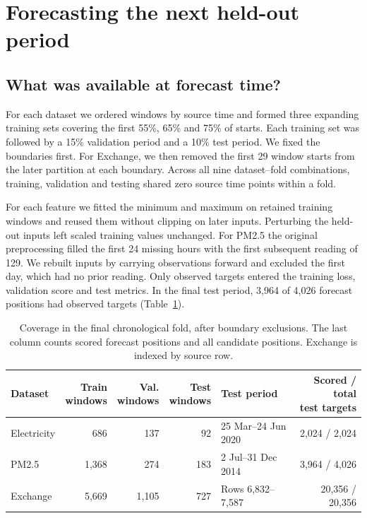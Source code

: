 \documentclass[10pt,a4paper]{article}
\begin{document}
\section{Forecasting the next held-out period}\label{sec:chronology}
\subsection{What was available at forecast time?}
For each dataset we ordered windows by source time and formed three expanding training sets covering the first 55\%, 65\% and 75\% of starts. Each training set was followed by a 15\% validation period and a 10\% test period. We fixed the boundaries first. For Exchange, we then removed the first 29 window starts from the later partition at each boundary. Across all nine dataset--fold combinations, training, validation and testing shared zero source time points within a fold.

For each feature we fitted the minimum and maximum on retained training windows and reused them without clipping on later inputs. Perturbing the held-out inputs left scaled training values unchanged. For PM2.5 the original preprocessing filled the first 24 missing hours with the first subsequent reading of 129. We rebuilt inputs by carrying observations forward and excluded the first day, which had no prior reading. Only observed targets entered the training loss, validation score and test metrics. In the final test period, 3,964 of 4,026 forecast positions had observed targets (Table~\ref{tab:2}).

\begin{table}[H]
\centering
\caption{Coverage in the final chronological fold, after boundary exclusions. The last column counts scored forecast positions and all candidate positions. Exchange is indexed by source row.}\label{tab:2}
\small
\begin{tabular}{@{}lrrrlr@{}}
\toprule
\textbf{Dataset} & \shortstack[r]{\textbf{Train}\\\textbf{windows}} & \shortstack[r]{\textbf{Val.}\\\textbf{windows}} & \shortstack[r]{\textbf{Test}\\\textbf{windows}} & \textbf{Test period} & \shortstack[r]{\textbf{Scored / total}\\\textbf{test targets}} \\
\midrule
Electricity & 686 & 137 & 92 & 25 Mar--24 Jun 2020 & 2,024 / 2,024 \\
PM2.5 & 1,368 & 274 & 183 & 2 Jul--31 Dec 2014 & 3,964 / 4,026 \\
Exchange & 5,669 & 1,105 & 727 & Rows 6,832--7,587 & 20,356 / 20,356 \\
\bottomrule
\end{tabular}
\end{table}
\end{document}
